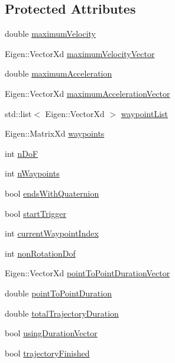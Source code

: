 \subsection*{Protected Attributes}
\begin{DoxyCompactItemize}
\item 
double \hyperlink{classocra_1_1Trajectory_ad79f3742bec59a80c3d641ccdc08012d}{maximum\+Velocity}
\item 
Eigen\+::\+Vector\+Xd \hyperlink{classocra_1_1Trajectory_a206795c8d7e3bcb38b893d69fe0fa336}{maximum\+Velocity\+Vector}
\item 
double \hyperlink{classocra_1_1Trajectory_a9dbb0a7d6ecaeaf98b915193a8c853d7}{maximum\+Acceleration}
\item 
Eigen\+::\+Vector\+Xd \hyperlink{classocra_1_1Trajectory_a86d9d30e890716e117ab2d3b4b328f3d}{maximum\+Acceleration\+Vector}
\item 
std\+::list$<$ Eigen\+::\+Vector\+Xd $>$ \hyperlink{classocra_1_1Trajectory_a37630b26ba23826298167f37534ff6f3}{waypoint\+List}
\item 
Eigen\+::\+Matrix\+Xd \hyperlink{classocra_1_1Trajectory_ab0514f8c3c8d4827b19dc863ff800b43}{waypoints}
\item 
int \hyperlink{classocra_1_1Trajectory_a6c5df48ec92b0a64dc39091bc0c17199}{n\+DoF}
\item 
int \hyperlink{classocra_1_1Trajectory_a233933b988029ac1a6ae24b58e59bf3e}{n\+Waypoints}
\item 
bool \hyperlink{classocra_1_1Trajectory_a4f230978860de9473f83df3b8ae31ad9}{ends\+With\+Quaternion}
\item 
bool \hyperlink{classocra_1_1Trajectory_af07103499262cbe56eba69a713e4f3b3}{start\+Trigger}
\item 
int \hyperlink{classocra_1_1Trajectory_a2eb6b279dca80ba684969374ddea0d8c}{current\+Waypoint\+Index}
\item 
int \hyperlink{classocra_1_1Trajectory_a6ea59dbc9549f00f95a05581dea36415}{non\+Rotation\+Dof}
\item 
Eigen\+::\+Vector\+Xd \hyperlink{classocra_1_1Trajectory_ad00d173bd78dc9ff365736e751fa3ef8}{point\+To\+Point\+Duration\+Vector}
\item 
double \hyperlink{classocra_1_1Trajectory_a7601711560c35d3096ed541708cce691}{point\+To\+Point\+Duration}
\item 
double \hyperlink{classocra_1_1Trajectory_a80c47706872b560842956d0b39a15518}{total\+Trajectory\+Duration}
\item 
bool \hyperlink{classocra_1_1Trajectory_af31e825f10a3b98840f9054f1741b289}{using\+Duration\+Vector}
\item 
bool \hyperlink{classocra_1_1Trajectory_ae3367f25d52a9b411a86f75a7b7d06ca}{trajectory\+Finished}
\end{DoxyCompactItemize}


